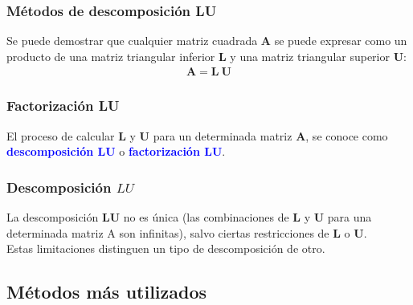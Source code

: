 \documentclass[12pt]{beamer}
\begin{document}
\begin{frame}
\frametitle{Métodos de descomposición \textbf{LU}}
Se puede demostrar que cualquier matriz cuadrada $\mathbf{A}$ se puede expresar como un producto de una matriz triangular inferior $\mathbf{L}$ y una matriz triangular superior $\mathbf{U}$:
\pause
\begin{align*}
\mathbf{A = L \: U}
\end{align*}
\end{frame}
\begin{frame}
\frametitle{Factorización \textbf{LU}}
El proceso de calcular $\mathbf{L}$ y $\mathbf{U}$ para un determinada matriz $\mathbf{A}$, se conoce como \textbf{\textcolor{blue}{descomposición LU}} \pause o \textbf{\textcolor{blue}{factorización LU}}.
\end{frame}
\begin{frame}
\frametitle{Descomposición $LU$}
La descomposición $\mathbf{LU}$ no es única \pause (las combinaciones de $\mathbf{L}$ y $\mathbf{U}$ para una determinada matriz A son infinitas), salvo ciertas restricciones de $\mathbf{L}$ o $\mathbf{U}$. 
\\
\bigskip
Estas limitaciones distinguen un tipo de descomposición de otro.
\end{frame}

\subsection{Métodos más utilizados}
\end{document}
